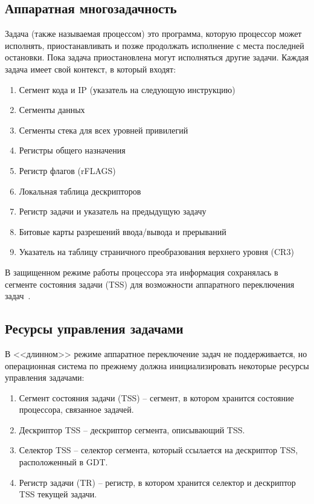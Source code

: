 \subsection{Аппаратная многозадачность}
Задача (также называемая процессом) это программа, которую процессор может
исполнять, приостанавливать и позже продолжать исполнение с места последней
остановки. Пока задача приостановлена могут исполняться другие задачи. Каждая
задача имеет свой контекст, в который входят:
\begin{enumerate}
\item Сегмент кода и IP (указатель на следующую инструкцию)
\item Сегменты данных
\item Сегменты стека для всех уровней привилегий
\item Регистры общего назначения
\item Регистр флагов (rFLAGS)
\item Локальная таблица дескрипторов
\item Регистр задачи и указатель на предыдущую задачу
\item Битовые карты разрешений ввода/вывода и прерываний
\item Указатель на таблицу страничного преобразования верхнего уровня (CR3)
\end{enumerate}

В защищенном режиме работы процессора эта информация сохранялась в
сегменте состояния задачи (TSS) для возможности аппаратного переключения
задач~\cite[стр. 327]{amd_pm_v2}.

\subsection{Ресурсы управления задачами}
В <<длинном>> режиме аппаратное переключение задач не поддерживается, но
операционная система по прежнему должна инициализировать некоторые ресурсы
управления задачами:
\begin{enumerate}
\item Сегмент состояния задачи (TSS) -- сегмент, в котором хранится состояние
	процессора, связанное задачей.
\item Дескриптор TSS -- дескриптор сегмента, описывающий TSS.
\item Селектор TSS -- селектор сегмента, который ссылается на дескриптор TSS,
	расположенный в GDT.
\item Регистр задачи (TR) -- регистр, в котором хранится селектор и дескриптор
	TSS текущей задачи.
\end{enumerate}

